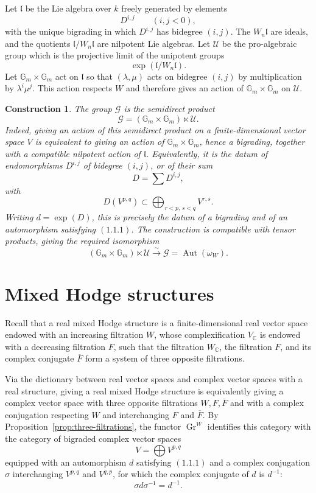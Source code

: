 \documentclass[11pt]{article}
\newtheorem{construction}{Construction}[section]
\newcommand{\Gr}{\operatorname{Gr}}
\newcommand{\Aut}{\operatorname{Aut}}
\newcommand{\Gm}{\mathbb G_m}
\begin{document}
Let \(\mathfrak l\) be the Lie algebra over \(k\) freely generated by elements
\[
   D^{i,j}\qquad (i,j<0),
\]
with the unique bigrading in which \(D^{i,j}\) has bidegree \((i,j)\).  The \(W_n\mathfrak l\) are ideals, and the quotients \(\mathfrak l/W_n\mathfrak l\) are nilpotent Lie algebras.  Let \(\mathcal U\) be the pro-algebraic group which is the projective limit of the unipotent groups
\[
   \exp(\mathfrak l/W_n\mathfrak l).
\]
Let \(\Gm\times\Gm\) act on \(\mathfrak l\) so that \((\lambda,\mu)\) acts on bidegree \((i,j)\) by multiplication by \(\lambda^i\mu^j\).  This action respects \(W\) and therefore gives an action of \(\Gm\times\Gm\) on \(\mathcal U\).

\begin{construction}\label{construction:G}
The group \(\mathcal G\) is the semidirect product
\[
   \mathcal G=(\Gm\times\Gm)\ltimes \mathcal U.
\]
Indeed, giving an action of this semidirect product on a finite-dimensional vector space \(V\) is equivalent to giving an action of \(\Gm\times\Gm\), hence a bigrading, together with a compatible nilpotent action of \(\mathfrak l\).  Equivalently, it is the datum of endomorphisms \(D^{i,j}\) of bidegree \((i,j)\), or of their sum
\[
   D=\sum D^{i,j},
\]
with
\[
   D(V^{p,q})\subset\bigoplus_{r<p,\,s<q}V^{r,s}.
\]
Writing \(d=\exp(D)\), this is precisely the datum of a bigrading and of an automorphism satisfying \((1.1.1)\).  The construction is compatible with tensor products, giving the required isomorphism
\[
   (\Gm\times\Gm)\ltimes\mathcal U\xrightarrow{\sim}\mathcal G=\Aut(\omega_W).
\]
\end{construction}

\section{Mixed Hodge structures}

Recall that a real mixed Hodge structure is a finite-dimensional real vector space endowed with an increasing filtration \(W\), whose complexification \(V_\mathbb C\) is endowed with a decreasing filtration \(F\), such that the filtration \(W_\mathbb C\), the filtration \(F\), and its complex conjugate \(\overline F\) form a system of three opposite filtrations.

Via the dictionary between real vector spaces and complex vector spaces with a real structure, giving a real mixed Hodge structure is equivalently giving a complex vector space with three opposite filtrations \(W,F,\overline F\) and with a complex conjugation respecting \(W\) and interchanging \(F\) and \(\overline F\).  By Proposition~\ref{prop:three-filtrations}, the functor \(\Gr^W\) identifies this category with the category of bigraded complex vector spaces
\[
   V=\bigoplus V^{p,q}
\]
equipped with an automorphism \(d\) satisfying \((1.1.1)\) and a complex conjugation \(\sigma\) interchanging \(V^{p,q}\) and \(V^{q,p}\), for which the complex conjugate of \(d\) is \(d^{-1}\):
\[
   \sigma d\sigma^{-1}=d^{-1}.
\]
\end{document}
